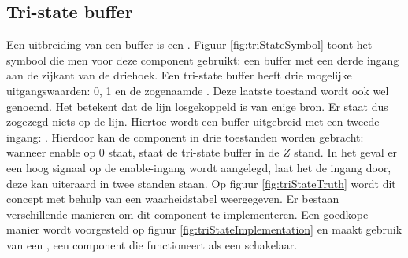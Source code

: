 \subsection{Tri-state buffer}
Een uitbreiding van een buffer is een . Figuur \ref{fig:triStateSymbol} toont het symbool die men voor deze component gebruikt: een buffer met een derde ingang aan de zijkant van de driehoek. Een tri-state buffer heeft drie mogelijke uitgangswaarden: 0, 1 en de zogenaamde . Deze laatste toestand wordt ook wel  genoemd. Het betekent dat de lijn losgekoppeld is van enige bron. Er staat dus zogezegd niets op de lijn. Hiertoe wordt een buffer uitgebreid met een tweede ingang: . Hierdoor kan de component in drie toestanden worden gebracht: wanneer enable op 0 staat, staat de tri-state buffer in de $Z$ stand. In het geval er een hoog signaal op de enable-ingang wordt aangelegd, laat het de ingang door, deze kan uiteraard in twee standen staan. Op figuur \ref{fig:triStateTruth} wordt dit concept met behulp van een waarheidstabel weergegeven. Er bestaan verschillende manieren om dit component te implementeren. Een goedkope manier wordt voorgesteld op figuur \ref{fig:triStateImplementation} en maakt gebruik van een , een component die functioneert als een schakelaar.
